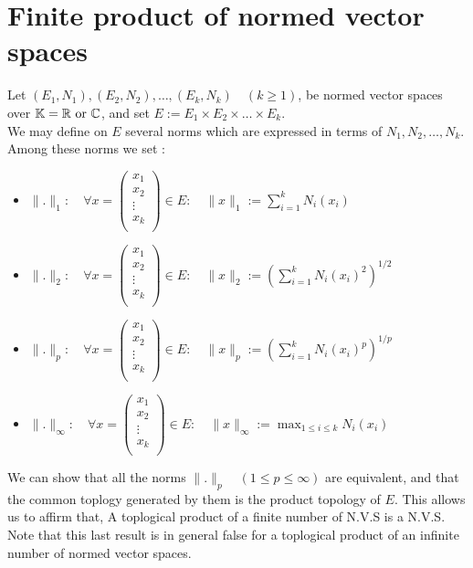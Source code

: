 \section{Finite product of normed vector spaces}
Let $\left( E_1,N_1 \right),
\left( E_2,N_2 \right), \hdots , \left( E_{k},N_{k} \right)
\quad  \left( k \geq 1 \right)$, be normed
vector spaces over $\mathbb{K}= \mathbb{R} \text{ or } \mathbb{C} $, and 
set $E := E_1 \times E_2 \times \hdots \times E_{k}$. \\
We may define on $E$ several norms which are expressed in 
terms of $N_1,N_2, \hdots , N_{k}$. Among these norms
we set :
\begin{itemize}
	\item $\| . \|_{1}: 
		\quad \forall x = 
		\begin{pmatrix}
			x_1 \\
			x_2 \\
			\vdots  \\
			x_{k} \\
		\end{pmatrix}
		\in E : \quad 
		\| x \| _{1} :=
		\sum_{i=1}^{k} 
		N_{i}\left( x_{i} \right)
		$ 
	\item 
		$
	        \| . \| _{2}: \quad 
		\forall x = 
		\begin{pmatrix}
			x_1 \\
			x_2 \\
			\vdots  \\
			x_{k} \\
		\end{pmatrix} 
		\in E: \quad 
		\| x \| _{2} :=
		\left( 
			\sum_{i=1}^{k} 
			N_{i}\left( x_{i} \right)^2 
		\right)^{1/2}
		$ 
	\item 
		$
		\| . \| _{p}: \quad 
		\forall x = 
		\begin{pmatrix}
			x_1 \\
			x_2 \\
			\vdots  \\
			x_{k} \\
		\end{pmatrix} 
		\in E: \quad 
		\| x \| _{p} :=
		\left(              
			\sum_{i=1}^{k} 
			N_{i}\left( x_{i} \right)^p 
		\right)^{1/p}
		$ 
	\item 
		$
		\| . \| _{\infty }: \quad 
		\forall x = 
		\begin{pmatrix}
			x_1 \\
			x_2 \\
			\vdots  \\
			x_{k} \\
		\end{pmatrix} 
		\in E: \quad 
		\| x \| _{\infty } :=
		\max _{1 \leq i \leq k}
		N_{i}\left( x_{i} \right)
		$ 
\end{itemize}
We can show that all the norms 
$\| . \| _{p} \quad \left( 
	1 \leq p \leq \infty 
\right)$ are equivalent, and that the common toplogy
generated by them is the product topology
of $E$. This allows us to affirm that, A toplogical
product of a finite number of N.V.S is a N.V.S.
\\
Note that this last result is in general false
for a toplogical product of an infinite number
of normed vector spaces.
